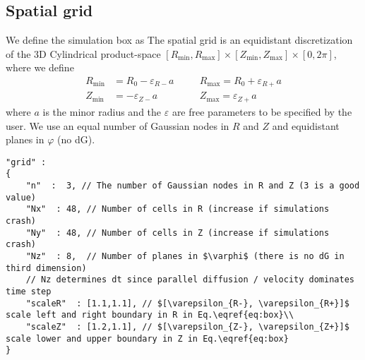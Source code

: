 \subsection{Spatial grid} \label{sec:spatial}
We define the simulation box as
The spatial grid is an equidistant discretization of the 3D Cylindrical
product-space
$[ R_{\min}, R_{\max}]\times [Z_{\min}, Z_{\max}] \times [0,2\pi]$,
where we define
\begin{align} \label{eq:box}
    R_{\min}&=R_0-\varepsilon_{R-}a\quad
    &&R_{\max}=R_0+\varepsilon_{R+}a\nonumber\\
    Z_{\min}&=-\varepsilon_{Z-}a\quad
    &&Z_{\max}=\varepsilon_{Z+}a
\end{align}
where $a$ is the minor radius and
the $\varepsilon$ are free parameters to be specified by the user.
We use an equal number of Gaussian nodes in $R$ and $Z$ and equidistant
planes in $\varphi$ (no dG).
\begin{verbatim}
"grid" :
{
    "n"  :  3, // The number of Gaussian nodes in R and Z (3 is a good value)
    "Nx"  : 48, // Number of cells in R (increase if simulations crash)
    "Ny"  : 48, // Number of cells in Z (increase if simulations crash)
    "Nz"  : 8,  // Number of planes in $\varphi$ (there is no dG in third dimension)
    // Nz determines dt since parallel diffusion / velocity dominates time step
    "scaleR"  : [1.1,1.1], // $[\varepsilon_{R-}, \varepsilon_{R+}]$ scale left and right boundary in R in Eq.\eqref{eq:box}\\
    "scaleZ"  : [1.2,1.1], // $[\varepsilon_{Z-}, \varepsilon_{Z+}]$ scale lower and upper boundary in Z in Eq.\eqref{eq:box}
}
\end{verbatim}
